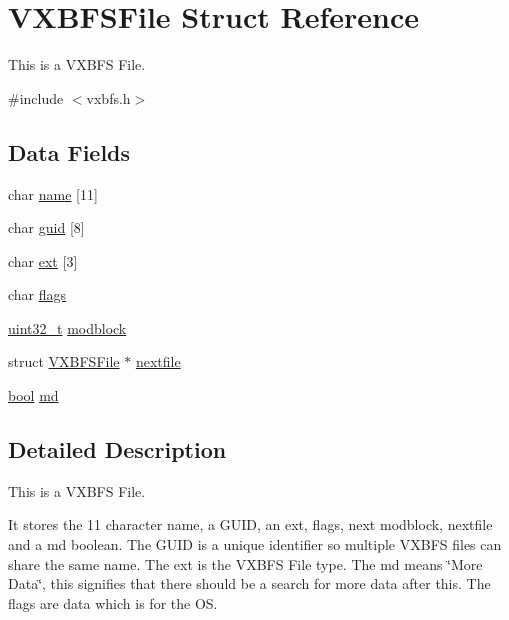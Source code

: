\hypertarget{a00336}{}\section{V\+X\+B\+F\+S\+File Struct Reference}
\label{a00336}


This is a V\+X\+B\+FS File.  




{\ttfamily \#include $<$vxbfs.\+h$>$}

\subsection*{Data Fields}
\begin{DoxyCompactItemize}
\item 
char \hyperlink{a00336_a07ecc9bacdc2943442f26f62f6749055_a07ecc9bacdc2943442f26f62f6749055}{name} \mbox{[}11\mbox{]}
\item 
char \hyperlink{a00336_a03b954de114d8e01bb783ddef964e8ca_a03b954de114d8e01bb783ddef964e8ca}{guid} \mbox{[}8\mbox{]}
\item 
char \hyperlink{a00336_ad030f5719e51b0b41b7cb6047f4110b2_ad030f5719e51b0b41b7cb6047f4110b2}{ext} \mbox{[}3\mbox{]}
\item 
char \hyperlink{a00336_a8fc3bc64d7f2330f923507d2430bdde4_a8fc3bc64d7f2330f923507d2430bdde4}{flags}
\item 
\hyperlink{a00140_a435d1572bf3f880d55459d9805097f62_a435d1572bf3f880d55459d9805097f62}{uint32\+\_\+t} \hyperlink{a00336_a56503c715b4121591ca7367c9cbd7093_a56503c715b4121591ca7367c9cbd7093}{modblock}
\item 
struct \hyperlink{a00336}{V\+X\+B\+F\+S\+File} $\ast$ \hyperlink{a00336_aa2c7e2e1b3827ce9fbaa045b89202784_aa2c7e2e1b3827ce9fbaa045b89202784}{nextfile}
\item 
\hyperlink{a00140_af6a258d8f3ee5206d682d799316314b1_af6a258d8f3ee5206d682d799316314b1}{bool} \hyperlink{a00336_adb380ce440ec23ef6c9c06d871be3c0d_adb380ce440ec23ef6c9c06d871be3c0d}{md}
\end{DoxyCompactItemize}


\subsection{Detailed Description}
This is a V\+X\+B\+FS File. 

It stores the 11 character name, a G\+U\+ID, an ext, flags, next modblock, nextfile and a md boolean. The G\+U\+ID is a unique identifier so multiple V\+X\+B\+FS files can share the same name. The ext is the V\+X\+B\+FS File type. The md means \char`\"{}\+More Data\char`\"{}, this signifies that there should be a search for more data after this. The flags are data which is for the OS. 

